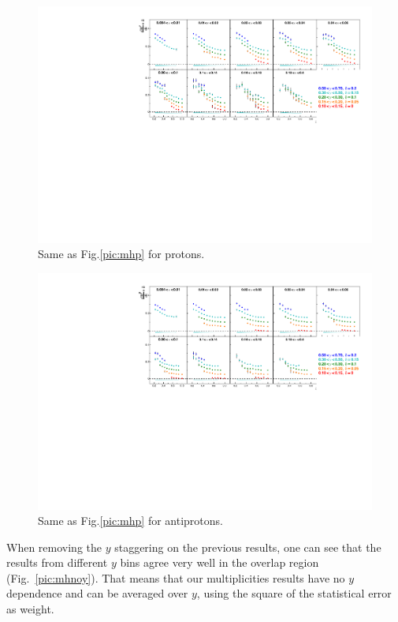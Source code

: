 \begin{figure}[!h]
  \centering
	\includegraphics[scale=0.85]{./gfx/pp.pdf}
	\caption{Same as Fig.\ref{pic:mhp} for protons.}
	\label{pic:mpp}
\end{figure}
\vfill
\newpage
\begin{figure}[!h]
  \centering
	\includegraphics[scale=0.85]{./gfx/pm.pdf}
	\caption{Same as Fig.\ref{pic:mhp} for antiprotons.}
	\label{pic:mpm}
\end{figure}

When removing the $y$ staggering on the previous results, one can see that the results from different $y$ bins agree very well in the overlap region (Fig.~\ref{pic:mhnoy}). That means that our multiplicities results have no $y$ dependence and can be averaged over $y$, using the square of the statistical error as weight.

